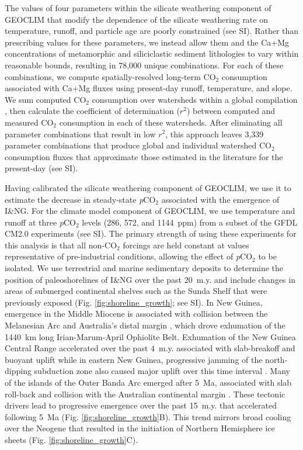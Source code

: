 \documentclass[11pt,letterpaper]{article}
\newcommand{\pCOtwo}{\textit{p}CO$_{2}$\xspace}
\newcommand{\COtwo}{CO$_{2}$\xspace}
\begin{document}
The values of four parameters within the silicate weathering component of GEOCLIM \cite{Gabet2009a, West2012a} that modify the dependence of the silicate weathering rate on temperature, runoff, and particle age are poorly constrained (see SI). Rather than prescribing values for these parameters, we instead allow them and the Ca+Mg concentrations of metamorphic and siliciclastic sediment lithologies to vary within reasonable bounds, resulting in 78,000 unique combinations. For each of these combinations, we compute spatially-resolved long-term \COtwo consumption associated with Ca+Mg fluxes using present-day runoff, temperature, and slope. We sum computed \COtwo consumption over watersheds within a global compilation \cite{Gaillardet1999a, Moquet2018a}, then calculate the coefficient of determination ($r^{2}$) between computed and measured \COtwo consumption in each of these watersheds. After eliminating all parameter combinations that result in low $r^{2}$, this approach leaves 3,339 parameter combinations that produce global and individual watershed \COtwo consumption fluxes that approximate those estimated in the literature for the present-day (see SI).

Having calibrated the silicate weathering component of GEOCLIM, we use it to estimate the decrease in steady-state \pCOtwo associated with the emergence of I\&NG. For the climate model component of GEOCLIM, we use temperature and runoff at three \pCOtwo levels (286, 572, and 1144~ppm) from a subset of the GFDL CM2.0 experiments \cite{Delworth2006a, Delworth2006b} (see SI). The primary strength of using these experiments for this analysis is that all non-\COtwo forcings are held constant at values representative of pre-industrial conditions, allowing the effect of \pCOtwo to be isolated. We use terrestrial and marine sedimentary deposits to determine the position of paleoshorelines of I\&NG over the past 20~m.y. and include changes in areas of submerged continental shelves such as the Sunda Shelf that were previously exposed (Fig. \ref{fig:shoreline_growth}; see SI). In New Guinea, emergence in the Middle Miocene is associated with collision between the Melanesian Arc and Australia's distal margin \cite{vanUfford2005a, Cloos2005a, Baldwin2012a}, which drove exhumation of the 1440~km long Irian-Marum-April Ophiolite Belt. Exhumation of the New Guinea Central Range accelerated over the past 4~m.y. associated with slab-breakoff and buoyant uplift \cite{Cloos2005a} while in eastern New Guinea, progressive jamming of the north-dipping subduction zone also caused major uplift over this time interval \cite{vanUfford2005a}. Many of the islands of the Outer Banda Arc emerged after 5~Ma, associated with slab roll-back and collision with the Australian continental margin \cite{Harris2006a, Hall2013b}. These tectonic drivers lead to progressive emergence over the past 15~m.y. that accelerated following 5~Ma (Fig. \ref{fig:shoreline_growth}B). This trend mirrors broad cooling over the Neogene that resulted in the initiation of Northern Hemisphere ice sheets (Fig. \ref{fig:shoreline_growth}C).
\end{document}
